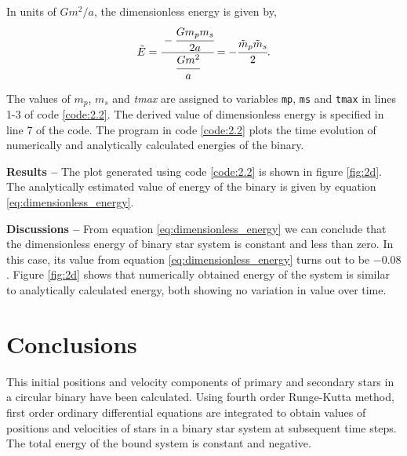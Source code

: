 \documentclass[a4paper]{article}
\begin{document}
\begin{enumerate} [label*=\textbf{(\alph*)}]
				In units of \(Gm^2/a\), the dimensionless energy is given by,
				\begin{equation}
					\tilde{E} = \cfrac{-\cfrac{G m_p m_s}{2a}}{\cfrac{G m^2}{a}} = -\cfrac{\tilde{m}_p \tilde{m}_s}{2}.
					\label{eq:dimensionless_energy}
				\end{equation}
				
				\begin{figure} [h]
					
				\end{figure}
				
				The values of \(m_p\), \(m_s\) and \emph{tmax} are assigned to variables \texttt{mp}, \texttt{ms} and \texttt{tmax} in lines 1-3 of code \ref{code:2.2}. The derived value of dimensionless energy is specified in line 7 of the code. The program in code \ref{code:2.2} plots the time evolution of numerically and analytically calculated energies of the binary.
				
				\subitem \textbf{Results  --}
				The plot generated using code \ref{code:2.2} is shown in figure \ref{fig:2d}. The analytically estimated value of energy of the binary is given by equation \ref{eq:dimensionless_energy}.
				
				\subitem \textbf{Discussions  --}
				From equation \ref{eq:dimensionless_energy} we can conclude that the dimensionless energy of binary star system is constant and less than zero. In this case, its value from equation \ref{eq:dimensionless_energy} turns out to be \(-0.08\). Figure \ref{fig:2d} shows that numerically obtained energy of the system is similar to analytically calculated energy, both showing no variation in value over time.
			
		\end{enumerate}



		\section{Conclusions} \label{2:conclusions}
		This initial positions and velocity components of primary and secondary stars in a circular binary have been calculated. Using fourth order Runge-Kutta method, first order ordinary differential equations are integrated to obtain values of positions and velocities of stars in a binary star system at subsequent time steps. The total energy of the bound system is constant and negative. 
\end{document}
